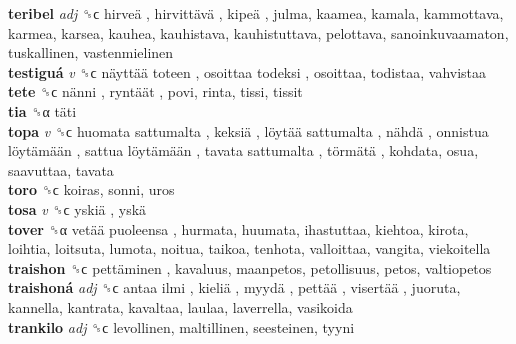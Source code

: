 \textbf{teribel} \emph{adj}  ␝ϲ   hirveä ,  hirvittävä ,  kipeä , julma, kaamea, kamala, kammottava, karmea, karsea, kauhea, kauhistava, kauhistuttava, pelottava, sanoinkuvaamaton, tuskallinen, vastenmielinen  \\
\textbf{testiguá} \emph{v}  ␝ϲ   näyttää toteen ,  osoittaa todeksi , osoittaa, todistaa, vahvistaa  \\
\textbf{tete} ␝ϲ   nänni ,  ryntäät , povi, rinta, tissi, tissit  \\
\textbf{tia} ␝α   täti   \\
\textbf{topa} \emph{v}  ␝ϲ   huomata sattumalta ,  keksiä ,  löytää sattumalta ,  nähdä ,  onnistua löytämään ,  sattua löytämään ,  tavata sattumalta ,  törmätä , kohdata, osua, saavuttaa, tavata  \\
\textbf{toro} ␝ϲ  koiras, sonni, uros  \\
\textbf{tosa} \emph{v}  ␝ϲ   yskiä ,  yskä   \\
\textbf{tover} ␝α   vetää puoleensa , hurmata, huumata, ihastuttaa, kiehtoa, kirota, loihtia, loitsuta, lumota, noitua, taikoa, tenhota, valloittaa, vangita, viekoitella  \\
\textbf{traishon} ␝ϲ   pettäminen , kavaluus, maanpetos, petollisuus, petos, valtiopetos  \\
\textbf{traishoná} \emph{adj}  ␝ϲ   antaa ilmi ,  kieliä ,  myydä ,  pettää ,  visertää , juoruta, kannella, kantrata, kavaltaa, laulaa, laverrella, vasikoida  \\
\textbf{trankilo} \emph{adj}  ␝ϲ  levollinen, maltillinen, seesteinen, tyyni  \\
